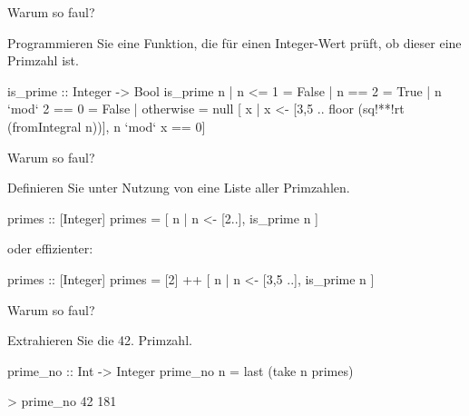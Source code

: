 \begin{frame}[fragile]{Warum so faul?}\onslide<+->%
    \begin{exercise}[a)]
    Programmieren Sie eine Funktion, die für einen Integer-Wert prüft, ob dieser eine Primzahl ist.
    \end{exercise}
    \onslide<+->\begin{solve}[a)]
    \begin{plainhaskell}
is_prime :: Integer -> Bool
is_prime n
    | n <= 1 = False
    | n == 2 = True
    | n `mod` 2 == 0 = False
    | otherwise = null [ x | x <- [3,5 .. floor (sq!**!rt (fromIntegral n))], n `mod` x == 0]
    \end{plainhaskell}
    \end{solve}
    \onslide<+->
\end{frame}
\resetframecounters
\begin{frame}[fragile]{Warum so faul?}\onslide<+->%
    \begin{exercise}[b)]
    Definieren Sie unter Nutzung von  eine Liste aller Primzahlen.
    \end{exercise}
    \onslide<+->\begin{solve}[b)]
    \begin{plainhaskell}
primes :: [Integer]
primes = [ n | n <- [2..], is_prime n ]
    \end{plainhaskell}
    \onslide<+->oder effizienter:
    \begin{plainhaskell}
primes :: [Integer]
primes = [2] ++ [ n | n <- [3,5 ..], is_prime n ]
    \end{plainhaskell}
    \end{solve}
\end{frame}
\resetframecounters
\begin{frame}[fragile]{Warum so faul?}\onslide<+->%
    \begin{exercise}[c)]
    Extrahieren Sie die 42. Primzahl.
    \end{exercise}
    \onslide<+->\begin{solve}[c)]
    \begin{plainhaskell}
prime_no :: Int -> Integer
prime_no n = last (take n primes)
    \end{plainhaskell}
    \onslide<+->\begin{plainbash}
> prime_no 42
181
    \end{plainbash}
    \end{solve}
\end{frame}